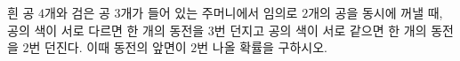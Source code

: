 흰 공 $4$개와 검은 공 $3$개가 들어 있는 주머니에서 임의로 $2$개의 공을 동시에 꺼낼 때, 공의 색이 서로 다르면 한 개의 동전을 $3$번 던지고 공의 색이 서로 같으면 한 개의 동전을 $2$번 던진다. 이때 동전의 앞면이 $2$번 나올 확률을 구하시오.
